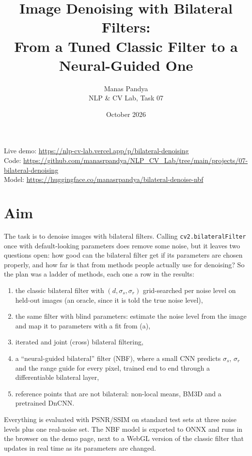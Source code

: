 \documentclass[11pt,a4paper]{article}
\title{Image Denoising with Bilateral Filters:\\From a Tuned Classic Filter to a Neural-Guided One}
\author{Manas Pandya\\[0.2em]\small NLP \& CV Lab, Task 07}
\date{October 2026}
\begin{document}
\maketitle

\begin{center}
\small
Live demo: \url{https://nlp-cv-lab.vercel.app/p/bilateral-denoising}\\
Code: \url{https://github.com/manasrpandya/NLP_CV_Lab/tree/main/projects/07-bilateral-denoising}\\
Model: \url{https://huggingface.co/manasrpandya/bilateral-denoise-nbf}
\end{center}

\section{Aim}

The task is to denoise images with bilateral filters. Calling \texttt{cv2.bilateralFilter} once with
default-looking parameters does remove some noise, but it leaves two questions open: how good can the
bilateral filter get if its parameters are chosen properly, and how far is that from methods people actually
use for denoising? So the plan was a ladder of methods, each one a row in the results:

\begin{enumerate}
\itemsep0em
\item[(a)] the classic bilateral filter with $(d, \sigma_s, \sigma_r)$ grid-searched per noise level on held-out
images (an oracle, since it is told the true noise level),
\item[(b)] the same filter with blind parameters: estimate the noise level from the image and map it to
parameters with a fit from (a),
\item[(c)] iterated and joint (cross) bilateral filtering,
\item[(d)] a ``neural-guided bilateral'' filter (NBF), where a small CNN predicts $\sigma_s$, $\sigma_r$ and the
range guide for every pixel, trained end to end through a differentiable bilateral layer,
\item[(e)] reference points that are not bilateral: non-local means, BM3D and a pretrained DnCNN.
\end{enumerate}

Everything is evaluated with PSNR/SSIM on standard test sets at three noise levels plus one real-noise set.
The NBF model is exported to ONNX and runs in the browser on the demo page, next to a WebGL version of
the classic filter that updates in real time as its parameters are changed.
\end{document}

